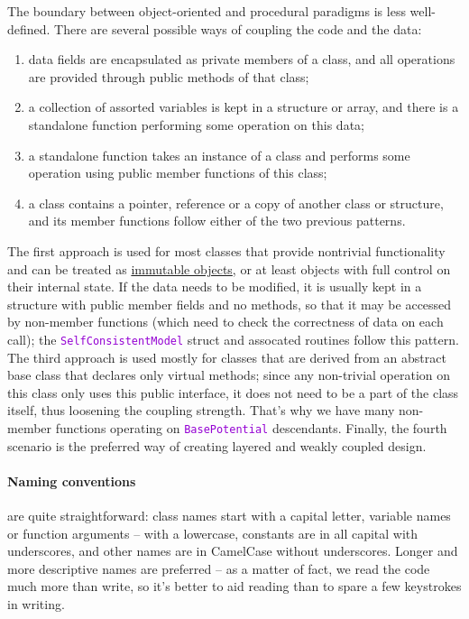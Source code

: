 \documentclass[12pt]{article}
\newcommand{\ttt}[1]{\textcolor{darkviolet}{\texttt{#1}}}
\let\oldparagraph\paragraph
\renewcommand{\paragraph}[1]{\vspace{-2mm}\oldparagraph{#1}}
\begin{document}
The boundary between object-oriented and procedural paradigms is less well-defined. There are several possible ways of coupling the code and the data:
\begin{enumerate} \setlength{\parskip}{2pt} \setlength{\itemsep}{2pt}
\item data fields are encapsulated as private members of a class, and all operations are provided through public methods of that class;
\item a collection of assorted variables is kept in a structure or array, and there is a standalone function performing some operation on this data;
\item a standalone function takes an instance of a class and performs some operation using public member functions of this class;
\item a class contains a pointer, reference or a copy of another class or structure, and its member functions follow either of the two previous patterns.
\end{enumerate}

The first approach is used for most classes that provide nontrivial functionality and can be treated as \hyperref[sec:Const]{immutable objects}, or at least objects with full control on their internal state. If the data needs to be modified, it is usually kept in a structure with public member fields and no methods, so that it may be accessed by non-member functions (which need to check the correctness of data on each call); the \ttt{SelfConsistentModel} struct and assocated routines follow this pattern. The third approach is used mostly for classes that are derived from an abstract base class that declares only virtual methods; since any non-trivial operation on this class only uses this public interface, it does not need to be a part of the class itself, thus loosening the coupling strength. That's why we have many non-member functions operating on \ttt{BasePotential} descendants. Finally, the fourth scenario is the preferred way of creating layered and weakly coupled design.

\paragraph{Naming conventions}  are quite straightforward: class names start with a capital letter, variable names or function arguments -- with a lowercase, constants are in all capital with underscores, and other names are in CamelCase without underscores. Longer and more descriptive names are preferred -- as a matter of fact, we read the code much more than write, so it's better to aid reading than to spare a few keystrokes in writing.
\end{document}
